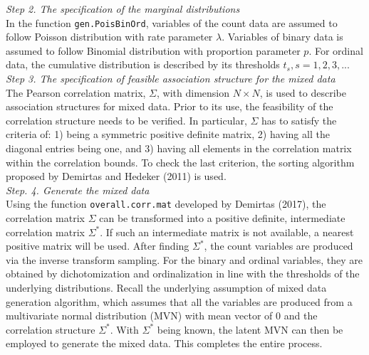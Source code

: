 \documentclass[letterpaper]{article}
\begin{document}
\textit{Step 2. The specification of the marginal distributions}\\
In the function \texttt{gen.PoisBinOrd}, variables of the count data are assumed to follow Poisson distribution with rate parameter $\lambda$.
Variables of binary data is assumed to follow Binomial distribution with proportion parameter $p$. For ordinal data, the cumulative distribution is described by its thresholds $t_s, s=1,2,3,...$\\



\textit{Step 3. The specification of feasible association structure for the mixed data}\\
The Pearson correlation matrix, $\Sigma$, with dimension $N \times N$, is used to describe association structures for mixed data. Prior to its use, the feasibility of the correlation structure needs to be verified. In particular, $\Sigma$ has to satisfy the criteria of: 1) being a symmetric positive definite matrix, 2) having all the diagonal entries being one, and 3) having all elements in the correlation matrix within the correlation bounds. To check the last criterion, the sorting algorithm proposed by Demirtas and Hedeker (2011) is used.\\



\textit{Step. 4. Generate the mixed data}\\
Using the function \texttt{overall.corr.mat} developed by Demirtas (2017), the correlation matrix $\Sigma$ can be transformed into a positive definite, intermediate correlation matrix $\Sigma^{*}$. If such an intermediate matrix is not available, a nearest positive matrix will be used. After finding $\Sigma^{*}$, the count variables are produced via the inverse transform sampling. For the binary and ordinal variables, they are obtained by dichotomization and ordinalization in line with the thresholds of the underlying distributions. Recall the  underlying assumption of mixed data generation algorithm, which assumes that all the variables are produced from a multivariate normal distribution (MVN) with mean vector of $0$ and the correlation structure $\Sigma^{*}$. With $\Sigma^{*}$ being known, the latent MVN can then be employed to generate the mixed data. This completes the entire process.  \\
\end{document}
